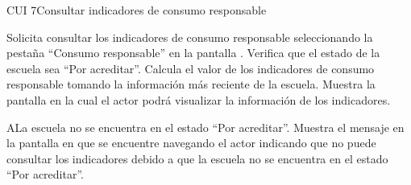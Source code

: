 \begin{UseCase}{CUI 7}{Consultar indicadores de consumo responsable}


	

	
\end{UseCase}
 \begin{UCtrayectoria}
    \UCpaso[\UCactor] Solicita consultar los indicadores de consumo responsable seleccionando la pestaña ``Consumo responsable'' en la pantalla .
    \UCpaso[\UCsist] Verifica que el estado de la escuela sea ``Por acreditar''.       
    \UCpaso[\UCsist] Calcula el valor de los indicadores de  consumo responsable tomando la información más reciente de la escuela.%
    \UCpaso[\UCsist] Muestra la pantalla  en la cual el actor podrá visualizar la información de los indicadores.
\end{UCtrayectoria}
 
 \begin{UCtrayectoriaA}{A}{La escuela no se encuentra en el estado ``Por acreditar''.}
    \UCpaso[\UCsist] Muestra el mensaje  en la pantalla en que se encuentre navegando el
    actor indicando que no puede consultar los indicadores debido a que la escuela no se encuentra en el estado ``Por acreditar''. 
 \end{UCtrayectoriaA}


